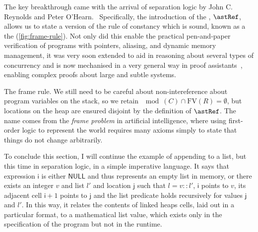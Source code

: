 The key breakthrough came with the arrival of separation logic by John C\@.
Reynolds and Peter O'Hearn.~ Specifically, the
introduction of the , $\astRef$, allows us to
state a version of the rule of constancy which is sound, known as a the
 (\cref{fig:frame-rule}). Not only did this enable the
practical pen-and-paper verification of programs with pointers, aliasing, and
dynamic memory management, it was very soon extended to aid in reasoning about
several types of concurrency and is now mechanised in a very general way in
proof assistants~\cite{jung2018iris, appel2011verified}, enabling complex
proofs about large and subtle systems.

\begin{marginfigure}
  \begin{mathpar}
  \end{mathpar}
  \caption{The frame rule. We still need to be careful about non-intereference
      about program variables on the stack, so we retain $\mod{(C)} \cap{}
      \mathrm{FV}(R) = \emptyset{}$, but locations on the heap are ensured
      disjoint by the definition of $\astRef$. The name comes from the
      \emph{frame problem} in artificial intelligence, where using first-order
      logic to represent the world requires many axioms simply to state that
      things do not change arbitrarily.}\label{fig:frame-rule}
\end{marginfigure}

To conclude this section, I will continue the example of appending to a list,
but this time in separation logic, in a simple imperative language. It says
that expression $\mathsf{i}$ is either $\mathsf{NULL}$ and thus represents an
empty list in memory, or there exists an integer $v$ and list $l'$ and location
$\mathsf{j}$ such that $l = v {:}{:} l'$, $\mathsf{i}$ points to $v$, its
adjacent cell $\mathsf{i}+1$ points to $\mathsf{j}$ and the list predicate
holds recursively for values $\mathsf{j}$ and $l'$. In this way, it relates the
contents of linked heaps cells, laid out in a particular format, to a
mathematical list  value, which exists only in the specification
of the program but not in the runtime.

